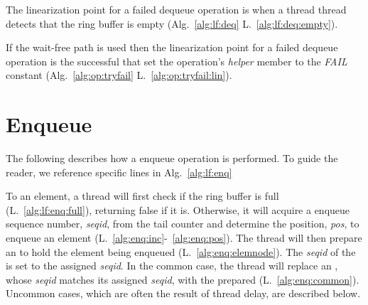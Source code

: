 The linearization point for a failed dequeue operation is when a thread thread detects that the ring buffer is empty  (Alg.~\ref{alg:lf:deq} L.~\ref{alg:lf:deq:empty}).

If the wait-free path is used then the linearization point for a failed dequeue operation is the successful  that set the operation's \emph{helper} member to the \emph{FAIL} constant (Alg.~\ref{alg:op:tryfail} L.~\ref{alg:op:tryfail:lin}).


\section{Enqueue} %
\label{sec:alg:dequeue}

\lfenqueue %
\wfenqueue %
\enqueueassoc %

The following describes how a enqueue operation is performed.
To guide the reader, we reference specific lines in Alg.~\ref{alg:lf:enq}

To  an element, a thread will first check if the ring buffer is full (L.~\ref{alg:lf:enq:full}), returning false if it is.
Otherwise, it will acquire a enqueue sequence number, \emph{seqid}, from the tail counter and determine the position, \emph{pos}, to enqueue an element (L.~\ref{alg:enq:inc}-~\ref{alg:enq:pos}).
The thread will then prepare an  to hold the element being enqueued (L.~\ref{alg:enq:elemnode}).
The \emph{seqid} of the  is set to the assigned \emph{seqid}.
In the common case,  the thread will replace an , whose \emph{seqid} matches its assigned \emph{seqid}, with the prepared  (L.~\ref{alg:enq:common}).
Uncommon cases, which are often the result of thread delay, are described below.

